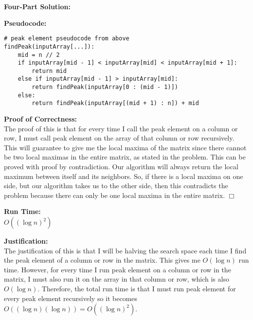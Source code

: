 \documentclass[11pt]{article}
\def\endproofmark{$\Box$}
\newenvironment{FourPartSolution}{\par{\bf Four-Part Solution:}}{\smallskip}
\newenvironment{pseudocode}{\par{\bf Pseudocode:}}{\smallskip}
\newenvironment{proofOfCorrectness}{\par{\bf Proof of Correctness:}}{\endproofmark\smallskip}
\newenvironment{runTime}{\par{\bf Run Time:}}{\smallskip}
\newenvironment{justification}{\par{\bf Justification:}}{\smallskip}
\begin{document}
\begin{FourPartSolution}
\begin{pseudocode}
\begin{lstlisting}
# peak element pseudocode from above
findPeak(inputArray[...]):
	mid = n // 2
	if inputArray[mid - 1] < inputArray[mid] < inputArray[mid + 1]:
		return mid
	else if inputArray[mid - 1] > inputArray[mid]:
		return findPeak(inputArray[0 : (mid - 1)])
	else:
		return findPeak(inputArray[(mid + 1) : n]) + mid
\end{lstlisting}
\end{pseudocode}
\begin{proofOfCorrectness}
\\
The proof of this is that for every time I call the peak element on a column or row, I must call peak element on the array of that column or row recursively. This will guarantee to give me the local maxima of the matrix since there cannot be two local maximas in the entire matrix, as stated in the problem. This can be proved with proof by contradiction. Our algorithm will always return the local maximum between itself and its neighbors. So, if there is a local maxima on one side, but our algorithm takes us to the other side, then this contradicts the problem because there can only be one local maxima in the entire matrix.
\end{proofOfCorrectness}
\\
\begin{runTime}
\\
$O((\log{n})^2)$
\end{runTime}
\\
\begin{justification}
\\
The justification of this is that I will be halving the search space each time I find the peak element of a column or row in the matrix. This gives me $O(\log{n})$ run time. However, for every time I run peak element on a column or row in the matrix, I must also run it on the array in that column or row, which is also $O(\log{n})$. Therefore, the total run time is that I must run peak element for every peak element recursively so it becomes $O((\log{n})(\log{n})) = O((\log{n})^2)$.
\end{justification}
\end{FourPartSolution}



\newpage
\end{document}
